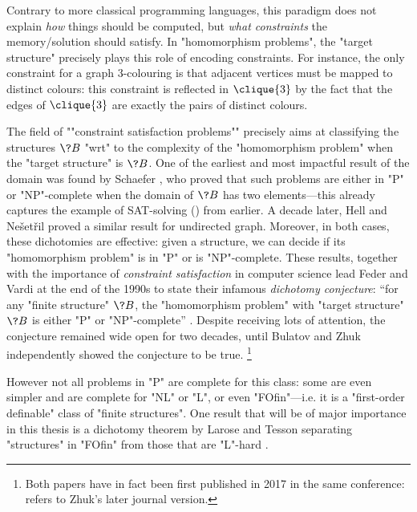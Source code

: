Contrary to more classical programming languages, this paradigm does not explain \emph{how} things
should be computed, but \emph{what constraints} the memory/solution should satisfy.
In "homomorphism problems", the "target structure" precisely plays this role of
encoding constraints. For instance, the only constraint for a graph $3$-colouring is that
adjacent vertices must be mapped to distinct colours: this constraint is
reflected in $\clique{3}$ by the fact that the edges of $\clique{3}$ are exactly the pairs
of distinct colours.

The field of \AP""constraint satisfaction problems"" precisely aims at classifying the
structures $\?B$ "wrt" to the complexity of the "homomorphism problem" when the
"target structure" is $\?B$. One of the earliest and most impactful result
of the domain was found by Schaefer \cite{Schaefer1978ComplexitySatisfiability},
who proved that such problems are either in "P" or "NP"-complete when the domain of $\?B$
has two elements---this already captures the example of SAT-solving () from earlier.
A decade later, Hell and Ne\v{s}et\v{r}il \cite{HellNesetril1990ComplexityColoring}
proved a similar result for undirected graph.
Moreover, in both cases, these dichotomies are effective: given a structure, we can decide if
its "homomorphism problem" is in "P" or is "NP"-complete.
These results, together with the importance of \emph{constraint satisfaction} in computer science
lead Feder and Vardi at the end of the 1990s
to state their infamous \emph{dichotomy conjecture}: ``for any "finite structure" $\?B$,
the "homomorphism problem" with "target structure" $\?B$ is either "P"
or "NP"-complete'' \cite{FederVardi1998ComputationalStructure}.
Despite receiving lots of attention, the conjecture remained wide open for two decades, until
Bulatov \cite{Bulatov2017DichotomyCSPs} and Zhuk \cite{Zhuk2020CSPDichotomy} independently
showed the conjecture to be true.%
\footnote{Both papers have in fact been first published in 2017 in the same conference:
\cite{Zhuk2020CSPDichotomy} refers to Zhuk's later journal version.}

However not all problems in "P" are complete for this class: some are even simpler and are complete
for "NL" or "L", or even "FOfin"---i.e. it is a "first-order definable" class of "finite structures".
One result that will be of major importance in this thesis is a dichotomy
theorem by Larose and Tesson separating "structures" in "FOfin" from those that are "L"-hard
\cite{LaroseTesson2009UniversalAlgebraCSP}.

